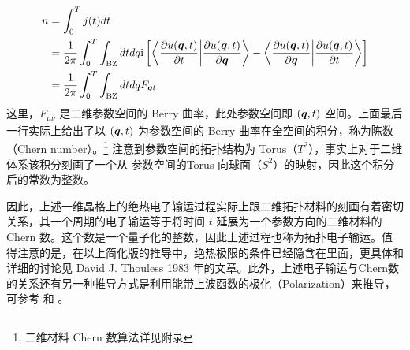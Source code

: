 \begin{align}
n &= \int_0^Tj(t)dt \\
& = \frac{1}{2\pi}\int_0^T\int_{\text{BZ}}dtdq \mathrm{i}\left[\left\langle\dfrac{\partial u(\boldsymbol{q},t)}{\partial t}\bigg|\dfrac{\partial u(\boldsymbol{q},t)}{\partial\boldsymbol{q}}\right\rangle - \left\langle\dfrac{\partial u(\boldsymbol{q},t)}{\partial\boldsymbol{q}}\bigg|\dfrac{\partial u(\boldsymbol{q},t)}{\partial t}\right\rangle\right] \\ 
& = \frac{1}{2\pi}\int_0^T\int_{\text{BZ}}dtdq F_{\boldsymbol{q}t}\label{Chern}
\end{align}
这里，$F_{\mu\nu}$ 是二维参数空间的 Berry 曲率，此处参数空间即 $(\boldsymbol{q}, t)$ 空间。上面最后一行实际上给出了以 $(\boldsymbol{q}, t)$ 为参数空间的 Berry 曲率在全空间的积分，称为陈数（Chern number）。\footnote{二维材料 Chern 数算法详见附录} 注意到参数空间的拓扑结构为 Torus（$T^2$），事实上对于二维体系该积分刻画了一个从 参数空间的Torus 向球面（$S^2$）的映射，因此这个积分后的常数为整数。


因此，上述一维晶格上的绝热电子输运过程实际上跟二维拓扑材料的刻画有着密切关系，其一个周期的电子输运等于将时间 $t$ 延展为一个参数方向的二维材料的 Chern 数。这个数是一个量子化的整数，因此上述过程也称为拓扑电子输运。值得注意的是，在以上简化版的推导中，绝热极限的条件已经隐含在里面，更具体和详细的讨论见 David J. Thouless 1983 年的文章。此外，上述电子输运与Chern数的关系还有另一种推导方式是利用能带上波函数的极化（Polarization）来推导，可参考 和 。


